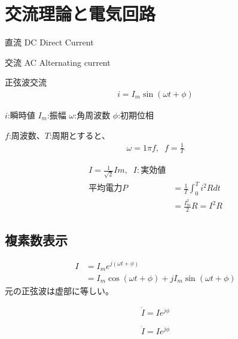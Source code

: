 \documentclass[12pt]{jsarticle}
\begin{document}

\section{交流理論と電気回路}
直流 DC Direct Current

交流 AC Alternating current

正弦波交流
\begin{align}i=I_m\sin{(\omega t+\phi)}\end{align}

$i$:瞬時値
$I_m$:振幅
$\omega$:角周波数
$\phi$:初期位相

$f$:周波数、$T$:周期とすると、
\begin{align*}
\omega = 1\pi f,\;\;f=\frac1T
\end{align*}

\begin{align*}
I=\frac1{\sqrt2}Im,\;\;I:実効値\\
平均電力P&=\frac1T\int^T_0i^2Rdt\\
&=\frac{I_m^2}2R=I^2R
\end{align*}

\subsection{複素数表示}
\begin{align*}
I&=I_me^{j(\omega t+\phi)}\\
&=I_m\cos(\omega t+\phi)+jI_m\sin(\omega t+\phi) 
\end{align*}
元の正弦波は虚部に等しい。

\begin{align*}
\dot I=Ie^{j\phi}
\end{align*}

\[
\dot I=Ie^{j\phi}
\]
\end{document}
